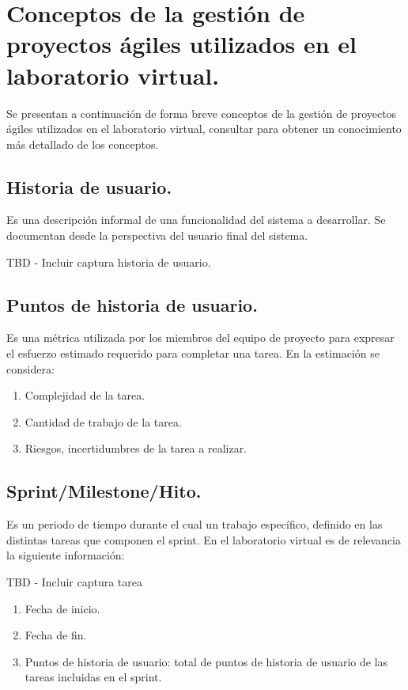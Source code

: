 
\section{Conceptos de la gestión de proyectos ágiles utilizados en el laboratorio virtual.}

Se presentan a continuación de forma breve conceptos de la gestión de proyectos ágiles utilizados en el laboratorio virtual, consultar \cite{agile-glossary} para obtener un conocimiento más detallado de los conceptos.

\subsection{Historia de usuario.}

Es una descripción informal de una funcionalidad del sistema a desarrollar. Se documentan desde la perspectiva del usuario final del sistema.

TBD - Incluir captura historia de usuario.

\subsection{Puntos de historia de usuario.}

Es una métrica utilizada por los miembros del equipo de proyecto para expresar el esfuerzo estimado requerido para completar una tarea. En la estimación se considera:

\begin{enumerate}
	\item Complejidad de la tarea.
	\item Cantidad de trabajo de la tarea.
	\item Riesgos, incertidumbres de la tarea a realizar.	
\end{enumerate}

\subsection{Sprint/Milestone/Hito.}

Es un periodo de tiempo durante el cual un trabajo específico, definido en las distintas tareas que componen el sprint. En el laboratorio virtual es de relevancia la siguiente información:

TBD - Incluir captura tarea

\begin{enumerate}
	\item Fecha de inicio.
	\item Fecha de fin.
	\item Puntos de historia de usuario: total de puntos de historia de usuario de las tareas incluidas en el sprint.	
\end{enumerate}


